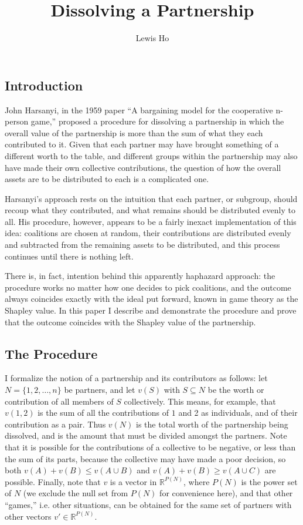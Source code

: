 \documentclass[12pt]{article}
\title{Dissolving a Partnership}
\author{Lewis Ho}
\begin{document}
\maketitle

\subsection*{Introduction}

John Harsanyi, in the 1959 paper ``A bargaining model for the cooperative n-person
game,'' proposed a procedure for dissolving a partnership in which the overall
value of the partnership is more than the sum of what they each contributed to it.
Given that each partner may have brought something of a different worth to the
table, and different groups within the partnership may also have made their own
collective contributions, the question of how the overall assets are to be
distributed to each is a complicated one.

Harsanyi's approach rests on the intuition that each partner, or subgroup,
should recoup what they contributed, and what remains should be distributed
evenly to all. His procedure, however, appears to be a fairly inexact
implementation of this idea: coalitions are chosen at random, their contributions
are distributed evenly and subtracted from the remaining assets to be distributed,
and this process continues until there is nothing left. 

There is, in fact, intention behind this apparently haphazard approach: 
the procedure works no matter how one decides to pick coalitions, and the outcome
always coincides exactly with the ideal put forward, known in game theory as
the Shapley value.
In this paper I describe and demonstrate the procedure and prove
that the outcome coincides with the Shapley value of the partnership.

\subsection*{The Procedure}

I formalize the notion of a partnership and its contributors as follows: let
$N = \{1,2,\ldots, n\}$ be partners, and let $v(S)$ with $S \subseteq N$ be
the worth or contribution of all members of $S$ collectively. This means, for
example, that $v(1,2)$ is the sum of all the contributions of $1$ and 2 as
individuals, and of their contribution as a pair. Thus $v(N)$ is the total
worth of the partnership being dissolved, and is the amount that must be divided
amongst the partners.
Note that it is
possible for the contributions of a collective to be negative, or less than
the sum of its parts, because the collective may have made a poor decision,
so both $v(A) + v(B) \leq v(A\cup B)$ and $v(A) + v(B) \geq v(A\cup C)$ are
possible. Finally, note that $v$ is a vector in $\mathbb{R}^{P(N)}$, where
$P(N)$ is the power set of $N$ (we exclude the null set from $P(N)$ for
convenience here), and that other ``games,'' i.e. other situations, can be
obtained for the same set of partners with other vectors $v'\in \mathbb{R}^{P(N)}$.
\end{document}
